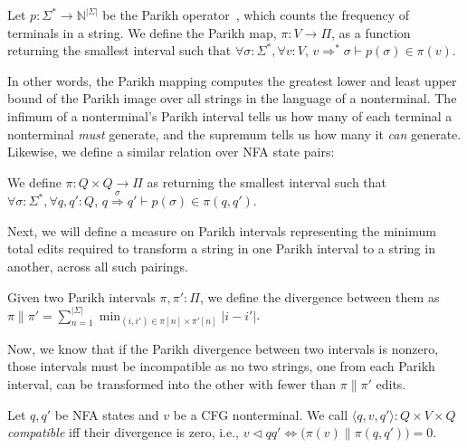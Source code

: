 \documentclass[sigplan,acmsmall,nonacm,screen]{acmart}\settopmatter{printfolios=false,printccs=false,printacmref=false}
\begin{document}
  \begin{definition}\label{def:parikh}
    Let $p: \Sigma^*\rightarrow\mathbb{N}^{|\Sigma|}$ be the Parikh operator~\cite{parikh1966context}, which counts the frequency of terminals in a string. We define the Parikh map, $\pi: V \rightarrow \Pi$, as a function returning the smallest interval such that $\forall \sigma: \Sigma^*, \forall v: V$, $v \Rightarrow^* \sigma \vdash p(\sigma) \in \pi(v)$.
  \end{definition}

  In other words, the Parikh mapping computes the greatest lower and least upper bound of the Parikh image over all strings in the language of a nonterminal. The infimum of a nonterminal's Parikh interval tells us how many of each terminal a nonterminal \textit{must} generate, and the supremum tells us how many it \textit{can} generate. Likewise, we define a similar relation over NFA state pairs:

  \begin{definition}
    We define $\pi: Q\times Q \rightarrow \Pi$ as returning the smallest interval such that $\forall \sigma: \Sigma^*, \forall q, q': Q$, $q \overset{\sigma}{\Longrightarrow} q' \vdash p(\sigma) \in \pi(q, q')$.
  \end{definition}

  Next, we will define a measure on Parikh intervals representing the minimum total edits required to transform a string in one Parikh interval to a string in another, across all such pairings.

  \begin{definition}
    Given two Parikh intervals $\pi, \pi': \Pi$, we define the divergence between them as $\pi \parallel \pi' = \sum_{n=1}^{|\Sigma|} \min_{(i, i') \in \pi[n]\times \pi'[n]} |i - i'|$.
  \end{definition}

  Now, we know that if the Parikh divergence between two intervals is nonzero, those intervals must be incompatible as no two strings, one from each Parikh interval, can be transformed into the other with fewer than $\pi \parallel \pi'$ edits.

  \begin{definition}
    Let $q, q'$ be NFA states and $v$ be a CFG nonterminal. We call $\langle q, v, q'\rangle: Q\times V\times Q$ \textit{compatible} iff their divergence is zero, i.e., $v \lhd qq' \iff \big(\pi(v) \parallel \pi(q, q')\big) = 0$.
  \end{definition}
\end{document}
